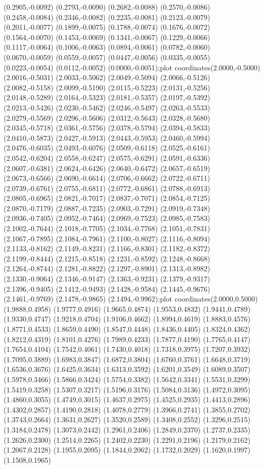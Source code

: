{(0.2905,-0.0092) (0.2793,-0.0090) (0.2682,-0.0088) (0.2570,-0.0086) (0.2458,-0.0084) (0.2346,-0.0082) (0.2235,-0.0081) (0.2123,-0.0079) (0.2011,-0.0077) (0.1899,-0.0075) (0.1788,-0.0074) (0.1676,-0.0072) (0.1564,-0.0070) (0.1453,-0.0069) (0.1341,-0.0067) (0.1229,-0.0066) (0.1117,-0.0064) (0.1006,-0.0063) (0.0894,-0.0061) (0.0782,-0.0060) (0.0670,-0.0059) (0.0559,-0.0057) (0.0447,-0.0056) (0.0335,-0.0055) (0.0223,-0.0054) (0.0112,-0.0052) (0.0000,-0.0051)};plot coordinates{(2.0000,-0.5000) (2.0016,-0.5031) (2.0033,-0.5062) (2.0049,-0.5094) (2.0066,-0.5126) (2.0082,-0.5158) (2.0099,-0.5190) (2.0115,-0.5223) (2.0131,-0.5256) (2.0148,-0.5289) (2.0164,-0.5323) (2.0181,-0.5357) (2.0197,-0.5392) (2.0213,-0.5426) (2.0230,-0.5462) (2.0246,-0.5497) (2.0263,-0.5533) (2.0279,-0.5569) (2.0296,-0.5606) (2.0312,-0.5643) (2.0328,-0.5680) (2.0345,-0.5718) (2.0361,-0.5756) (2.0378,-0.5794) (2.0394,-0.5833) (2.0410,-0.5873) (2.0427,-0.5913) (2.0443,-0.5953) (2.0460,-0.5994) (2.0476,-0.6035) (2.0493,-0.6076) (2.0509,-0.6118) (2.0525,-0.6161) (2.0542,-0.6204) (2.0558,-0.6247) (2.0575,-0.6291) (2.0591,-0.6336) (2.0607,-0.6381) (2.0624,-0.6426) (2.0640,-0.6472) (2.0657,-0.6519) (2.0673,-0.6566) (2.0690,-0.6614) (2.0706,-0.6662) (2.0722,-0.6711) (2.0739,-0.6761) (2.0755,-0.6811) (2.0772,-0.6861) (2.0788,-0.6913) (2.0805,-0.6965) (2.0821,-0.7017) (2.0837,-0.7071) (2.0854,-0.7125) (2.0870,-0.7179) (2.0887,-0.7235) (2.0903,-0.7291) (2.0919,-0.7348) (2.0936,-0.7405) (2.0952,-0.7464) (2.0969,-0.7523) (2.0985,-0.7583) (2.1002,-0.7644) (2.1018,-0.7705) (2.1034,-0.7768) (2.1051,-0.7831) (2.1067,-0.7895) (2.1084,-0.7961) (2.1100,-0.8027) (2.1116,-0.8094) (2.1133,-0.8162) (2.1149,-0.8231) (2.1166,-0.8301) (2.1182,-0.8372) (2.1199,-0.8444) (2.1215,-0.8518) (2.1231,-0.8592) (2.1248,-0.8668) (2.1264,-0.8744) (2.1281,-0.8822) (2.1297,-0.8901) (2.1313,-0.8982) (2.1330,-0.9064) (2.1346,-0.9147) (2.1363,-0.9231) (2.1379,-0.9317) (2.1396,-0.9405) (2.1412,-0.9493) (2.1428,-0.9584) (2.1445,-0.9676) (2.1461,-0.9769) (2.1478,-0.9865) (2.1494,-0.9962)};plot coordinates{(2.0000,0.5000) (1.9888,0.4958) (1.9777,0.4916) (1.9665,0.4874) (1.9553,0.4832) (1.9441,0.4789) (1.9330,0.4747) (1.9218,0.4704) (1.9106,0.4662) (1.8994,0.4619) (1.8883,0.4576) (1.8771,0.4533) (1.8659,0.4490) (1.8547,0.4448) (1.8436,0.4405) (1.8324,0.4362) (1.8212,0.4319) (1.8101,0.4276) (1.7989,0.4233) (1.7877,0.4190) (1.7765,0.4147) (1.7654,0.4104) (1.7542,0.4061) (1.7430,0.4018) (1.7318,0.3975) (1.7207,0.3932) (1.7095,0.3889) (1.6983,0.3847) (1.6872,0.3804) (1.6760,0.3761) (1.6648,0.3719) (1.6536,0.3676) (1.6425,0.3634) (1.6313,0.3592) (1.6201,0.3549) (1.6089,0.3507) (1.5978,0.3466) (1.5866,0.3424) (1.5754,0.3382) (1.5642,0.3341) (1.5531,0.3299) (1.5419,0.3258) (1.5307,0.3217) (1.5196,0.3176) (1.5084,0.3136) (1.4972,0.3095) (1.4860,0.3055) (1.4749,0.3015) (1.4637,0.2975) (1.4525,0.2935) (1.4413,0.2896) (1.4302,0.2857) (1.4190,0.2818) (1.4078,0.2779) (1.3966,0.2741) (1.3855,0.2702) (1.3743,0.2664) (1.3631,0.2627) (1.3520,0.2589) (1.3408,0.2552) (1.3296,0.2515) (1.3184,0.2478) (1.3073,0.2442) (1.2961,0.2406) (1.2849,0.2370) (1.2737,0.2335) (1.2626,0.2300) (1.2514,0.2265) (1.2402,0.2230) (1.2291,0.2196) (1.2179,0.2162) (1.2067,0.2128) (1.1955,0.2095) (1.1844,0.2062) (1.1732,0.2029) (1.1620,0.1997) (1.1508,0.1965) }
